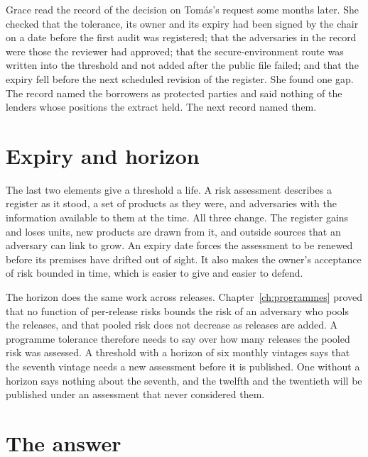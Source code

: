 Grace read the record of the decision on Tom\'as's request some months later. She
checked that the tolerance, its owner and its expiry had been signed by the chair
on a date before the first audit was registered; that the adversaries in the
record were those the reviewer had approved; that the secure-environment route was
written into the threshold and not added after the public file failed; and that
the expiry fell before the next scheduled revision of the register. She found one
gap. The record named the borrowers as protected parties and said nothing of the
lenders whose positions the extract held. The next record named them.

\section{Expiry and horizon}\label{c07:sec-expiry}

The last two elements give a threshold a life. A risk assessment describes a
register as it stood, a set of products as they were, and adversaries with the
information available to them at the time. All three change. The register gains
and loses units, new products are drawn from it, and outside sources that an
adversary can link to grow. An expiry date forces the assessment to be renewed
before its premises have drifted out of sight. It also makes the owner's acceptance
of risk bounded in time, which is easier to give and easier to defend.

The horizon does the same work across releases. Chapter~\ref{ch:programmes}
proved that no function of per-release risks bounds the risk of an adversary who
pools the releases, and that pooled risk does not decrease as releases are added. A
programme tolerance therefore needs to say over how many releases the pooled risk
was assessed. A threshold with a horizon of six monthly vintages says that the
seventh vintage needs a new assessment before it is published. One without a
horizon says nothing about the seventh, and the twelfth and the twentieth will be
published under an assessment that never considered them.

\section{The answer}\label{c07:sec-answer}

